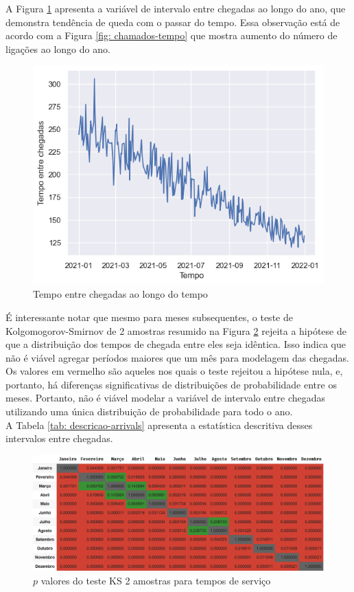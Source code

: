 A Figura \ref*{fig: arrivals-tempo} apresenta a variável de intervalo entre chegadas ao longo do ano, que demonstra tendência de queda com o passar do tempo. Essa observação está de acordo com a Figura \ref*{fig: chamados-tempo} que mostra aumento do número de ligações ao longo do ano. 

\begin{figure}[H]
    \includegraphics{analise-de-dados/anual/arrivals-tempo.png}
    \caption{Tempo entre chegadas ao longo do tempo}
    \label{fig: arrivals-tempo}
\end{figure}

É interessante notar que mesmo para meses subsequentes, o teste de Kolgomogorov-Smirnov de 2 amostras resumido na Figura \ref*{fig: ks-arrivals} rejeita a hipótese de que a distribuição dos tempos de chegada entre eles seja idêntica. Isso indica que não é viável agregar períodos maiores que um mês para modelagem das chegadas. Os valores em vermelho são aqueles nos quais o teste rejeitou a hipótese nula, e, portanto, há diferenças significativas de distribuições de probabilidade entre os meses. Portanto, não é viável modelar a variável de intervalo entre chegadas utilizando uma única distribuição de probabilidade para todo o ano.\\
A Tabela \ref*{tab: descricao-arrivals} apresenta a estatística descritiva desses intervalos entre chegadas.

\begin{figure}[H]
    \includegraphics[scale=0.6]{analise-de-dados/anual/ks-arrivals.png}
    \caption{$p$ valores do teste KS 2 amostras para tempos de serviço}
    \label{fig: ks-arrivals}
\end{figure}

